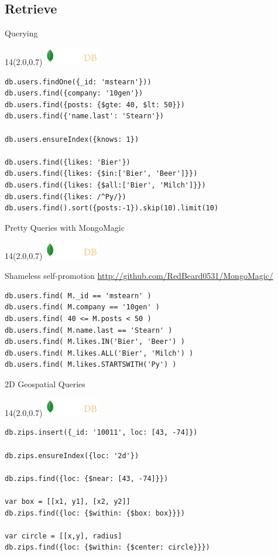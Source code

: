 \documentclass{beamer}
\newcommand{\MongoLogo}{
\begin{textblock}{14}(2.0,0.7)
  \includegraphics[height=0.8cm]{logo-mongodb-ondark.png}
\end{textblock}
}
\begin{document}
\subsection{Retrieve}
\begin{frame}[fragile]{Querying}
  \MongoLogo

  \begin{lstlisting}
db.users.findOne({_id: 'mstearn'}))
db.users.find({company: '10gen'})
db.users.find({posts: {$gte: 40, $lt: 50}}) 
db.users.find({'name.last': 'Stearn'})

db.users.ensureIndex({knows: 1})

db.users.find({likes: 'Bier'})
db.users.find({likes: {$in:['Bier', 'Beer']}})
db.users.find({likes: {$all:['Bier', 'Milch']}})
db.users.find({likes: /^Py/})
db.users.find().sort({posts:-1}).skip(10).limit(10)
  \end{lstlisting}
\end{frame}

\begin{frame}[fragile]{Pretty Queries with MongoMagic}
  \MongoLogo

  \begin{block}{Shameless self-promotion}
    \url{http://github.com/RedBeard0531/MongoMagic/}
  \end{block}

  \begin{lstlisting}
db.users.find( M._id == 'mstearn' )
db.users.find( M.company == '10gen' )
db.users.find( 40 <= M.posts < 50 ) 
db.users.find( M.name.last == 'Stearn' )
db.users.find( M.likes.IN('Bier', 'Beer') )
db.users.find( M.likes.ALL('Bier', 'Milch') )
db.users.find( M.likes.STARTSWITH('Py') )
  \end{lstlisting}
\end{frame}

\begin{frame}[fragile]{2D Geospatial Queries}
  \MongoLogo

  \small
  \begin{lstlisting}
db.zips.insert({_id: '10011', loc: [43, -74]})

db.zips.ensureIndex({loc: '2d'})

db.zips.find({loc: {$near: [43, -74]}})

var box = [[x1, y1], [x2, y2]]
db.zips.find({loc: {$within: {$box: box}}})

var circle = [[x,y], radius]
db.zips.find({loc: {$within: {$center: circle}}})
                 
  \end{lstlisting}
\end{frame}
\end{document}
